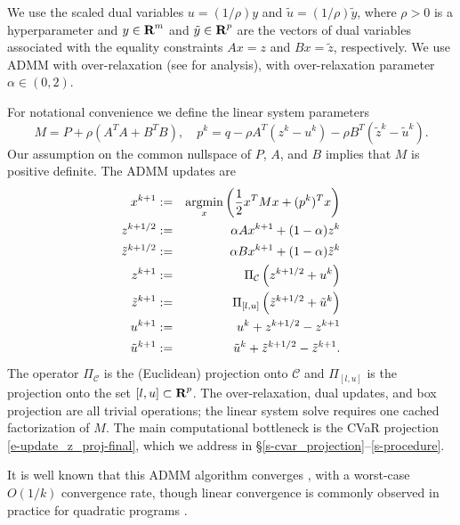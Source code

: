 \documentclass[12pt]{article}
\begin{document}
We use the scaled dual variables $u=(1/\rho)y$
and $\tilde{u}=(1/\rho)\tilde{y}$, where $\rho > 0$ is a hyperparameter and $y
\in {\mbox{\bf R}}^m$ and $\tilde{y} \in {\mbox{\bf R}}^p$ are the vectors of dual variables
associated with the equality constraints $Ax = z$ and $Bx = \tilde{z}$,
respectively.
We use ADMM with over-relaxation 
(see \cite{eckstein1992douglas, eckstein1994parallel} for
analysis), with over-relaxation parameter $\alpha\in(0,2)$.

For notational convenience we define the linear system parameters
\[
    M = P + \rho (A^TA + B^TB), \quad p^k = q - \rho A^T(z^k - u^k) - \rho B^T(\tilde{z}^k - \tilde{u}^k).
\]
Our assumption on the common nullspace of $P$, $A$, and $B$ implies that
$M$ is positive definite.
The ADMM updates are
\begin{eqnarray}
    x^{k+1} &:=& \mathop{\rm argmin}_x \left( \frac{1}{2}x^TMx + (p^k)^Tx\right) 
\label{e-update_x-final} \\
    z^{k+1/2} &:=& \alpha A x^{k+1} + (1-\alpha)z^k\label{e-update_z_half}\\
    \tilde{z}^{k+1/2} &:=& \alpha B x^{k+1} + (1-\alpha)\tilde{z}^k\label{e-update_ztilde_half}\\
    z^{k+1} &:=& \Pi_{\mathcal{C}}\left(z^{k+1/2}+ u^k\right) \label{e-update_z_proj-final} \\
    \tilde{z}^{k+1} &:=& \Pi_{[l,u]}\left(\tilde{z}^{k+1/2} + \tilde{u}^k\right)
    \label{e-update_ztilde_proj-final}\\
    u^{k+1} &:=& u^k + z^{k+1/2} - z^{k+1}\label{e-update_u}\\
    \tilde{u}^{k+1} &:=& \tilde{u}^k + \tilde z^{k+1/2} - \tilde{z}^{k+1}.\label{e-update_utilde}
\end{eqnarray}
The operator $\Pi_\mathcal{C}$ is the (Euclidean) projection onto
$\mathcal{C}$ and
$\Pi_{[l,u]}$ is the projection onto the set $[l,u]\subset {\mbox{\bf R}}^p$.
The over-relaxation, dual updates, and box projection are all trivial
operations; the linear system solve requires one cached factorization
of $M$. The main computational bottleneck is the CVaR projection
\eqref{e-update_z_proj-final}, which we address in \S\ref{s-cvar_projection}--\ref{s-procedure}.

It is well known that this ADMM algorithm converges
\cite{eckstein1992douglas,GABAY1983299}, with a worst-case $O(1/k)$
convergence rate, though linear convergence is commonly observed in
practice for quadratic programs \cite{boyd2011distributed}.
\end{document}
